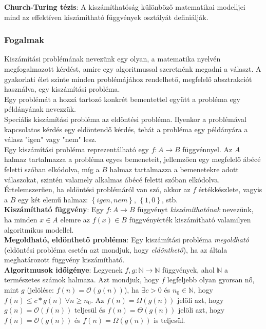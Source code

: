 \documentclass[margin=0px]{article}
\begin{document}
	\noindent \textbf{Church-Turing tézis}: A kiszámíthatóság különböző matematikai modelljei mind az effektíven
	kiszámítható függvények osztályát definiálják.
	
	\subsubsection{Fogalmak}	

	Kiszámítási problémának nevezünk egy olyan, a matematika nyelvén megfogalmazott
	kérdést, amire egy algoritmussal szeretnénk megadni a választ. A
	gyakorlati élet szinte minden problémájához rendelhető, megfelelő absztrakciót
	használva, egy kiszámítási probléma.\\
	
	\noindent Egy problémát a hozzá tartozó konkrét bementettel együtt a probléma egy
	példányának nevezzük.\\
	
	Speciális kiszámítási probléma az eldöntési probléma. Ilyenkor a problémával
	kapcsolatos kérdés egy eldöntendő kérdés, tehát a probléma egy példányára a
	válasz "igen" vagy "nem" lesz.\\
	
	Egy kiszámítási probléma reprezentálható egy $f : A \to B$ függvénnyel. Az $A$
	halmaz tartalmazza a probléma egyes bemeneteit, jellemzően egy megfelelő ábécé
	feletti szóban elkódolva, míg a $B$ halmaz tartalmazza a bemenetekre adott
	válaszokat, szintén valamely alkalmas ábécé feletti szóban elkódolva. Értelemszerűen,
	ha eldöntési problémáról van szó, akkor az $f$ értékkészlete, vagyis a $B$
	egy két elemű halmaz: $\left\{igen, nem\right\}$, $\left\{1, 0\right\}$, stb.\\
	
	\noindent \textbf{Kiszámítható függvény}: Egy $f : A \to B$ függvényt \textit{kiszámíthatónak}
	nevezünk, ha minden $x \in A$ elemre az $f(x) \in B$ függvényérték kiszámítható valamilyen
	algoritmikus modellel.\\
	
	\noindent \textbf{Megoldható, eldönthető probléma}: Egy kiszámítási probléma \textit{megoldható}
	(eldöntési probléma esetén azt mondjuk, hogy \textit{eldönthető}), ha az általa meghatározott
	függvény kiszámítható.\\

	\noindent \textbf{Algoritmusok időigénye}: Legyenek $f,g: \mathbb{N} \to \mathbb{N}$ függvények, ahol
	$\mathbb{N}$ a természetes számok halmaza. Azt mondjuk, hogy $f$ legfeljebb olyan gyorsan nő, mint $g$
	(jelölése: $f(n) = \mathcal{O}(g(n))$), ha $\exists c>0$ és $n_{0} \in \mathbb{N}$, hogy
	$f(n) \leq c * g(n) \ \forall n \geq n_{0}$. Az $f(n) = \Omega(g(n))$ jelöli azt, hogy $g(n) = \mathcal{O}(f(n))$
	teljesül és $f(n) = \Theta(g(n))$ jelöli azt, hogy  $f(n) = \mathcal{O}(g(n))$ és $f(n) = \Omega(g(n))$ is teljesül.\\
	
\end{document}
